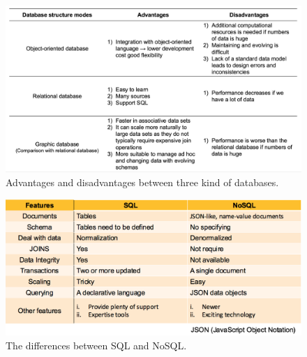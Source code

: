 \begin{figure}[h]
	\begin{center}
		\includegraphics[width=1.8\columnwidth]{Wolverine_Method_Chart_2}
	\end{center}
	\caption{Advantages and disadvantages between three kind of databases.\label{WMC2}}	
\end{figure}
\begin{figure}[h]
	\begin{center}
		\includegraphics[width=1.8\columnwidth]{Wolverine_Method_Chart_3}
	\end{center}
	\caption{The differences between SQL and NoSQL. \label{WMC3}}
\end{figure}

\newpage %
